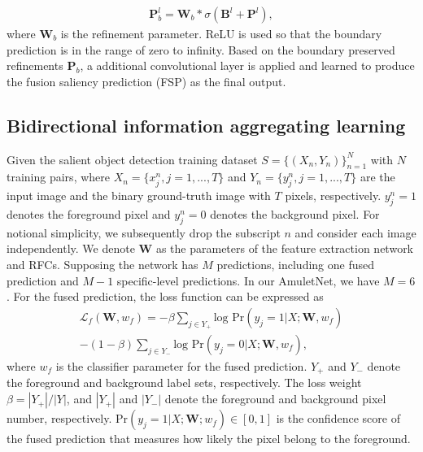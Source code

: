 \documentclass[10pt,twocolumn,letterpaper]{article}
\begin{document}
\begin{equation}
  \label{equ:equ3}
\begin{aligned}
 \textbf{P}_{b}^{l} = \textbf{W}_{b}*\sigma(\textbf{B}^{l}+\textbf{P}^{l}),
\end{aligned}
\end{equation}
where $\textbf{W}_{b}$ is the refinement parameter.
%
ReLU is used so that the boundary prediction is in the range of zero to infinity.
%
Based on the boundary preserved refinements $\textbf{P}_{b}$, a additional convolutional layer is applied and learned to produce the fusion saliency prediction (FSP) as the final output.
%
\subsection{Bidirectional information aggregating learning}
Given the salient object detection training dataset $ S=\{(X_n,Y_n)\}^{N}_{n=1}$ with $N$ training pairs, where $X_n =
\{x^n_j,j = 1,...,T\}$ and $Y_n = \{y^n_j,j = 1,...,T\}$ are the input image and the binary ground-truth image with $T$ pixels, respectively.
%
$y^n_j = 1$ denotes the foreground pixel and $y^n_j = 0$ denotes the background pixel.
%
For notional simplicity, we subsequently drop the subscript $n$ and consider each image independently.
%
We denote $\textbf{W}$ as the parameters of the feature extraction network and RFCs.
%
Supposing the network has $M$ predictions, including one fused prediction and $M-1$ specific-level predictions. In our AmuletNet, we have $M =6$.
%
For the fused prediction, the loss function can be expressed as
\begin{equation}
  \label{equ:equ4}
\begin{aligned}
  \mathcal{L}_f(\textbf{W},w_f)= - \beta \sum_{j\in Y_{+}} \text{log~Pr}(y_{j}=1|X;\textbf{W},w_f)\\
  -(1-\beta)\sum_{j\in Y_{-}} \text{log~Pr}(y_{j}=0|X;\textbf{W},w_f),
\end{aligned}
\end{equation}
where $w_f$ is the classifier parameter for the fused prediction.
%
$Y_{+}$ and $Y_{-}$ denote the foreground and background label sets, respectively.
%
The loss weight $\beta = |Y_{+}|/|Y|$, and $|Y_{+}|$ and $|Y_{-}|$ denote the foreground and background pixel number, respectively.
%
Pr$(y_j =1|X;\textbf{W};w_f)\in [0,1]$ is the confidence score of the fused prediction that measures how likely the pixel belong to the foreground.
%
\end{document}
